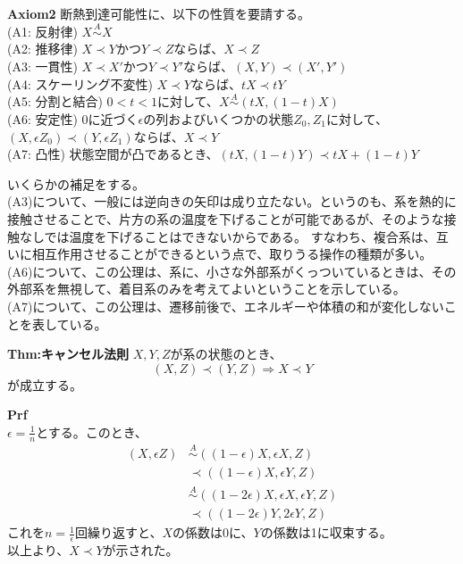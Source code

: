 \documentclass[a4paper,11pt]{jsarticle}
\numberwithin{equation}{section}
\begin{document}
\begin{itembox}[l]{\textbf{Axiom2}}
  断熱到達可能性に、以下の性質を要請する。\\
    (A1: 反射律) $ X \overset{A}{\sim} X$\\
    (A2: 推移律) $X \prec Y$かつ$Y \prec Z$ならば、$X \prec Z$\\
    (A3: 一貫性) $X \prec X'$かつ$Y \prec Y'$ならば、$(X,Y) \prec (X',Y')$\\
    (A4: スケーリング不変性) $X \prec Y$ならば、$tX \prec tY$\\
    (A5: 分割と結合) $0<t<1$に対して、$X \overset{A}{\sim} (tX,(1-t)X)$\\
    (A6: 安定性) 0に近づく$\epsilon$の列およびいくつかの状態$Z_0,Z_1$に対して、$(X,\epsilon Z_0) \prec (Y,\epsilon Z_1)$ならば、$X \prec Y$ \\
    (A7: 凸性) 状態空間が凸であるとき、$(tX,(1-t)Y) \prec tX+(1-t)Y$
\end{itembox}
いくらかの補足をする。\\
(A3)について、一般には逆向きの矢印は成り立たない。というのも、系を熱的に接触させることで、片方の系の温度を下げることが可能であるが、そのような接触なしでは温度を下げることはできないからである。
すなわち、複合系は、互いに相互作用させることができるという点で、取りうる操作の種類が多い。\\

(A6)について、この公理は、系に、小さな外部系がくっついているときは、その外部系を無視して、着目系のみを考えてよいということを示している。\\

(A7)について、この公理は、遷移前後で、エネルギーや体積の和が変化しないことを表している。

\begin{itembox}[l]{\textbf{Thm:キャンセル法則}}
  $X,Y,Z$が系の状態のとき、
  \begin{equation}
      (X,Z) \prec (Y,Z) \Rightarrow X \prec Y
  \end{equation}
  が成立する。

\end{itembox}
\textbf{Prf}\\
$\epsilon =\frac{1}{n}$とする。このとき、
\begin{align}
    (X,\epsilon Z) &\overset{A}{\sim} ((1-\epsilon)X,\epsilon X,Z)\\
    &\prec ((1-\epsilon)X,\epsilon Y,Z)\\
    &\overset{A}{\sim} ((1-2\epsilon)X,\epsilon X,\epsilon Y,Z)\\
    &\prec ((1-2\epsilon)Y,2\epsilon Y,Z)
    \end{align}
これを$n=\frac{1}{\epsilon}$回繰り返すと、$X$の係数は0に、$Y$の係数は1に収束する。\\
以上より、$X \prec Y$が示された。\hfill\qedsymbol\\
\end{document}
